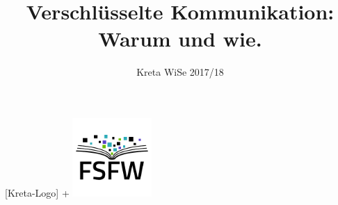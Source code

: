 \documentclass{beamer}
\title{Verschlüsselte Kommunikation: Warum und wie.}
\subtitle{Kreta WiSe 2017/18}
\begin{document}
\begin{frame}
  \begin{center}%
  [Kreta-Logo] + 
    \includegraphics[width=3cm]{img-src/fsfw-logo-with-text.pdf}\\[4mm]
    \vspace*{-0.5\baselineskip}

    \parbox{.95\columnwidth}{\centering\Large\inserttitle}

    \vspace*{\baselineskip}

    \structure{\large \insertsubtitle}
  \end{center}
\end{frame}


\end{document}
